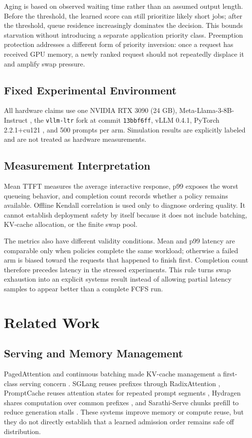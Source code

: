 \documentclass[conference]{IEEEtran}
\begin{document}
Aging is based on observed waiting time rather than an assumed output length. Before the threshold, the learned score can still prioritize likely short jobs; after the threshold, queue residence increasingly dominates the decision. This bounds starvation without introducing a separate application priority class. Preemption protection addresses a different form of priority inversion: once a request has received GPU memory, a newly ranked request should not repeatedly displace it and amplify swap pressure.

\subsection{Fixed Experimental Environment}
All hardware claims use one NVIDIA RTX 3090 (24 GB), Meta-Llama-3-8B-Instruct \cite{dubey2024llama3}, the \texttt{vllm-ltr} fork at commit \texttt{13bbf6ff}, vLLM 0.4.1, PyTorch 2.2.1+cu121 \cite{paszke2019pytorch}, and 500 prompts per arm. Simulation results are explicitly labeled and are not treated as hardware measurements.

\subsection{Measurement Interpretation}
Mean TTFT measures the average interactive response, p99 exposes the worst queueing behavior, and completion count records whether a policy remains available. Offline Kendall correlation is used only to diagnose ordering quality. It cannot establish deployment safety by itself because it does not include batching, KV-cache allocation, or the finite swap pool.

The metrics also have different validity conditions. Mean and p99 latency are comparable only when policies complete the same workload; otherwise a failed arm is biased toward the requests that happened to finish first. Completion count therefore precedes latency in the stressed experiments. This rule turns swap exhaustion into an explicit systems result instead of allowing partial latency samples to appear better than a complete FCFS run.

\section{Related Work}
\subsection{Serving and Memory Management}
PagedAttention and continuous batching made KV-cache management a first-class serving concern \cite{kwon2023pagedattention}. SGLang reuses prefixes through RadixAttention \cite{zheng2024sglang}, PromptCache reuses attention states for repeated prompt segments \cite{gim2024promptcache}, Hydragen shares computation over common prefixes \cite{juravsky2024hydragen}, and Sarathi-Serve chunks prefill to reduce generation stalls \cite{agrawal2024sarathi}. These systems improve memory or compute reuse, but they do not directly establish that a learned admission order remains safe off distribution.
\end{document}
